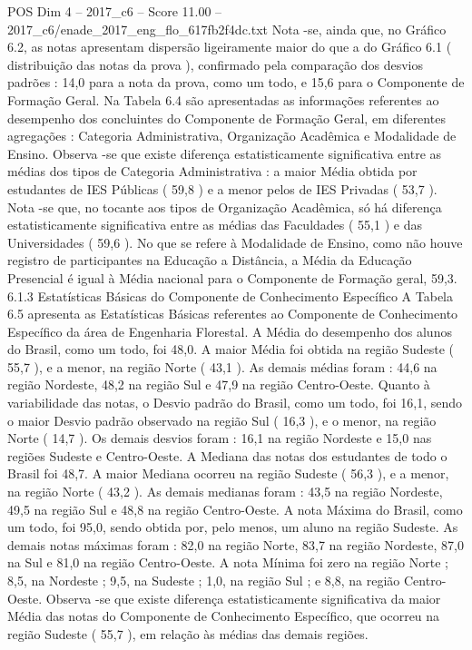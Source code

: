 \begin{textsample}{POS Dim 4 – 2017\_c6 – Score 11.00 – 2017\_c6/enade\_2017\_eng\_flo\_617fb2f4dc.txt}
Nota -se, ainda que, no Gráfico 6.2, as notas apresentam dispersão ligeiramente maior do que a do Gráfico 6.1 ( distribuição das notas da prova ), confirmado pela comparação dos desvios padrões : 14,0 para a nota da prova, como um todo, e 15,6 para o Componente de Formação Geral.
Na Tabela 6.4 são apresentadas as informações referentes ao desempenho dos concluintes do Componente de Formação Geral, em diferentes agregações : Categoria Administrativa, Organização Acadêmica e Modalidade de Ensino.
Observa -se que existe diferença estatisticamente significativa entre as médias dos tipos de Categoria Administrativa : a maior Média obtida por estudantes de IES Públicas ( 59,8 ) e a menor pelos de IES Privadas ( 53,7 ).
Nota -se que, no tocante aos tipos de Organização Acadêmica, só há diferença estatisticamente significativa entre as médias das Faculdades ( 55,1 ) e das Universidades ( 59,6 ).
No que se refere à Modalidade de Ensino, como não houve registro de participantes na Educação a Distância, a Média da Educação Presencial é igual à Média nacional para o Componente de Formação geral, 59,3. 6.1.3 Estatísticas Básicas do Componente de Conhecimento Específico A Tabela 6.5 apresenta as Estatísticas Básicas referentes ao Componente de Conhecimento Específico da área de Engenharia Florestal.
A Média do desempenho dos alunos do Brasil, como um todo, foi 48,0.
A maior Média foi obtida na região Sudeste ( 55,7 ), e a menor, na região Norte ( 43,1 ).
As demais médias foram : 44,6 na região Nordeste, 48,2 na região Sul e 47,9 na região Centro-Oeste.
Quanto à variabilidade das notas, o Desvio padrão do Brasil, como um todo, foi 16,1, sendo o maior Desvio padrão observado na região Sul ( 16,3 ), e o menor, na região Norte ( 14,7 ).
Os demais desvios foram : 16,1 na região Nordeste e 15,0 nas regiões Sudeste e Centro-Oeste.
A Mediana das notas dos estudantes de todo o Brasil foi 48,7.
A maior Mediana ocorreu na região Sudeste ( 56,3 ), e a menor, na região Norte ( 43,2 ).
As demais medianas foram : 43,5 na região Nordeste, 49,5 na região Sul e 48,8 na região Centro-Oeste.
A nota Máxima do Brasil, como um todo, foi 95,0, sendo obtida por, pelo menos, um aluno na região Sudeste.
As demais notas máximas foram : 82,0 na região Norte, 83,7 na região Nordeste, 87,0 na Sul e 81,0 na região Centro-Oeste.
A nota Mínima foi zero na região Norte ; 8,5, na Nordeste ; 9,5, na Sudeste ; 1,0, na região Sul ; e 8,8, na região Centro-Oeste.
Observa -se que existe diferença estatisticamente significativa da maior Média das notas do Componente de Conhecimento Específico, que ocorreu na região Sudeste ( 55,7 ), em relação às médias das demais regiões.

\end{textsample}
